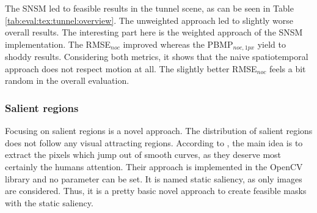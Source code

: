 \noindent The SNSM led to feasible results in the tunnel scene, as can be seen in Table \ref{tab:eval:tex:tunnel:overview}.
The unweighted approach led to slightly worse overall results.
The interesting part here is the weighted approach of the SNSM implementation.
The RMSE$_{noc}$ improved whereas the PBMP$_{noc,1px}$ yield to shoddy results.
Considering both metrics, it shows that the naive spatiotemporal approach does not respect motion at all.
The slightly better RMSE$_{noc}$ feels a bit random in the overall evaluation.

\subsubsection{Salient regions}

Focusing on salient regions is a novel approach.
The distribution of salient regions does not follow any visual attracting regions.
According to \citeauthor{hou2007saliency} \citep{hou2007saliency}, the main idea is to extract the pixels which jump out of smooth curves, as they deserve most certainly the humans attention.
Their approach is implemented in the OpenCV library and no parameter can be set.
It is named static saliency, as only images are considered.
Thus, it is a pretty basic novel approach to create feasible masks with the static saliency.

